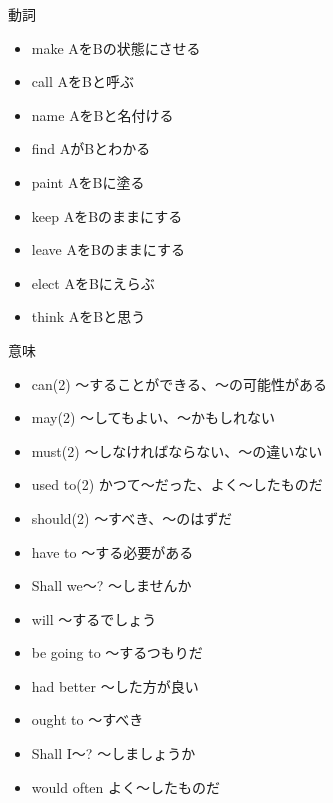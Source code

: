 \documentclass[10pt]{jsarticle}
\newcommand{\answer}[2]{{\color{orange}#2}}
\newcommand{\question}[2]{{\color{orange}#2}}
\newcommand{\answer}[2]{\vspace{#1mm}}
\newcommand{\question}[2]{#1}
\begin{document}
\begin{itembox}[l]{動詞}
	\begin{multicols}{3}
		\begin{itemize}
			\item make \answer{5}{AをBの状態にさせる}
			\item call \answer{5}{AをBと呼ぶ}
			\item name \answer{5}{AをBと名付ける}
			\item find \answer{5}{AがBとわかる}
			\item paint \answer{5}{AをBに塗る}
			\item keep \answer{5}{AをBのままにする}
			\item leave \answer{5}{AをBのままにする}
			\item elect \answer{5}{AをBにえらぶ}
			\item think \answer{5}{AをBと思う}
		\end{itemize}
	\end{multicols}
\end{itembox}


\newpage
\question{\section{助動詞 英語$\rightarrow$ 日本語}}{{\color{black}\section{助動詞}}}


\begin{itembox}[l]{意味}
	\begin{multicols}{2}
		\begin{itemize}
			\item can(2) \answer{5}{〜することができる、〜の可能性がある}
			\item may(2) \answer{5}{〜してもよい、〜かもしれない}
			\item must(2) \answer{5}{〜しなければならない、〜の違いない}
			\item used to(2) \answer{5}{かつて〜だった、よく〜したものだ}
			\item should(2) \answer{5}{〜すべき、〜のはずだ}
			\item have to \answer{5}{〜する必要がある}
			\item Shall we〜? \answer{5}{〜しませんか}
			\item will \answer{5}{〜するでしょう}
			\item be going to \answer{5}{〜するつもりだ}
			\item had better \answer{5}{〜した方が良い}
			\item ought to \answer{5}{〜すべき}
			\item Shall I〜? \answer{5}{〜しましょうか}
			\item would often \answer{5}{よく〜したものだ}
		\end{itemize}
	\end{multicols}
\end{itembox}
\end{document}
